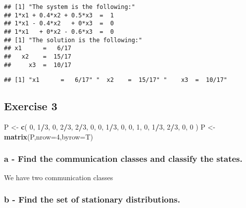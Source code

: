 \documentclass[]{article}
\newenvironment{Shaded}{\begin{snugshade}}{\end{snugshade}}
\newcommand{\DataTypeTok}[1]{\textcolor[rgb]{0.13,0.29,0.53}{#1}}
\newcommand{\DecValTok}[1]{\textcolor[rgb]{0.00,0.00,0.81}{#1}}
\newcommand{\KeywordTok}[1]{\textcolor[rgb]{0.13,0.29,0.53}{\textbf{#1}}}
\newcommand{\NormalTok}[1]{#1}
\newcommand{\OperatorTok}[1]{\textcolor[rgb]{0.81,0.36,0.00}{\textbf{#1}}}
\newcommand{\StringTok}[1]{\textcolor[rgb]{0.31,0.60,0.02}{#1}}
\begin{document}
\begin{verbatim}
## [1] "The system is the following:"
## 1*x1 + 0.4*x2 + 0.5*x3  =  1 
## 1*x1 - 0.4*x2   + 0*x3  =  0 
## 1*x1   + 0*x2 - 0.6*x3  =  0 
## [1] "The solution is the following:"
## x1      =   6/17 
##   x2    =  15/17 
##     x3  =  10/17
\end{verbatim}

\begin{verbatim}
## [1] "x1      =   6/17" "  x2    =  15/17" "    x3  =  10/17"
\end{verbatim}

\hypertarget{exercise-3}{%
\subsection{Exercise 3}\label{exercise-3}}

\begin{Shaded}
\begin{Highlighting}[]
\NormalTok{P <-}\StringTok{ }\KeywordTok{c}\NormalTok{(  }\DecValTok{0}\NormalTok{, }\DecValTok{1}\OperatorTok{/}\DecValTok{3}\NormalTok{,   }\DecValTok{0}\NormalTok{, }\DecValTok{2}\OperatorTok{/}\DecValTok{3}\NormalTok{,}
       \DecValTok{2}\OperatorTok{/}\DecValTok{3}\NormalTok{,   }\DecValTok{0}\NormalTok{,   }\DecValTok{0}\NormalTok{, }\DecValTok{1}\OperatorTok{/}\DecValTok{3}\NormalTok{,}
         \DecValTok{0}\NormalTok{,   }\DecValTok{0}\NormalTok{,   }\DecValTok{1}\NormalTok{,   }\DecValTok{0}\NormalTok{,}
       \DecValTok{1}\OperatorTok{/}\DecValTok{3}\NormalTok{, }\DecValTok{2}\OperatorTok{/}\DecValTok{3}\NormalTok{,   }\DecValTok{0}\NormalTok{,   }\DecValTok{0}\NormalTok{ )}
\NormalTok{P <-}\StringTok{ }\KeywordTok{matrix}\NormalTok{(P,}\DataTypeTok{nrow=}\DecValTok{4}\NormalTok{,}\DataTypeTok{byrow=}\NormalTok{T)}
\end{Highlighting}
\end{Shaded}

\hypertarget{a---find-the-communication-classes-and-classify-the-states.}{%
\subsubsection{a - Find the communication classes and classify the
states.}\label{a---find-the-communication-classes-and-classify-the-states.}}

We have two communication classes

\hypertarget{b---find-the-set-of-stationary-distributions.}{%
\subsubsection{b - Find the set of stationary
distributions.}\label{b---find-the-set-of-stationary-distributions.}}
\end{document}
